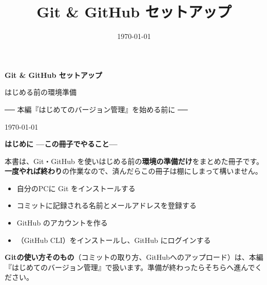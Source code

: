 \documentclass[book, paper=a4, fontsize=10.5pt, titlepage]{jlreq}
\title{Git \& GitHub セットアップ}
\author{}
\date{\today}
\begin{document}
\begin{titlepage}
  \centering
  \vspace*{4cm}
  {\sffamily\bfseries\Huge Git \& GitHub セットアップ\par}
  \vspace{1.2cm}
  {\sffamily\Large はじめる前の環境準備\par}
  \vspace{0.6cm}
  {\sffamily\normalsize ── 本編『はじめてのバージョン管理』を始める前に ──\par}
  \vfill
  {\large \today\par}
\end{titlepage}

\thispagestyle{empty}
\vspace*{1.5cm}
{\sffamily\LARGE\bfseries はじめに —この冊子でやること—\par}
\vspace{1em}

本書は、Git・GitHub を使いはじめる前の\textbf{環境の準備だけ}をまとめた冊子です。\textbf{一度やれば終わり}の作業なので、済んだらこの冊子は棚にしまって構いません。

\begin{itemize}[leftmargin=1.6em]
  \item 自分のPCに Git をインストールする
  \item コミットに記録される名前とメールアドレスを登録する
  \item GitHub のアカウントを作る
  \item {}（GitHub CLI）をインストールし、GitHub にログインする
\end{itemize}

\begin{hintbox}
\textbf{Gitの使い方そのもの}（コミットの取り方、GitHubへのアップロード）は、本編『はじめてのバージョン管理』で扱います。準備が終わったらそちらへ進んでください。
\end{hintbox}

\clearpage

\tableofcontents
\clearpage



\end{document}
